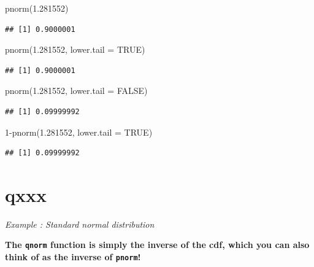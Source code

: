\documentclass[
]{book}
\newenvironment{Shaded}{\begin{snugshade}}{\end{snugshade}}
\newcommand{\AttributeTok}[1]{\textcolor[rgb]{0.77,0.63,0.00}{#1}}
\newcommand{\ConstantTok}[1]{\textcolor[rgb]{0.00,0.00,0.00}{#1}}
\newcommand{\DecValTok}[1]{\textcolor[rgb]{0.00,0.00,0.81}{#1}}
\newcommand{\FloatTok}[1]{\textcolor[rgb]{0.00,0.00,0.81}{#1}}
\newcommand{\FunctionTok}[1]{\textcolor[rgb]{0.00,0.00,0.00}{#1}}
\newcommand{\NormalTok}[1]{#1}
\newcommand{\SpecialCharTok}[1]{\textcolor[rgb]{0.00,0.00,0.00}{#1}}
\begin{document}
\begin{Shaded}
\begin{Highlighting}[]
\FunctionTok{pnorm}\NormalTok{(}\FloatTok{1.281552}\NormalTok{)}
\end{Highlighting}
\end{Shaded}

\begin{verbatim}
## [1] 0.9000001
\end{verbatim}

\begin{Shaded}
\begin{Highlighting}[]
\FunctionTok{pnorm}\NormalTok{(}\FloatTok{1.281552}\NormalTok{, }\AttributeTok{lower.tail =} \ConstantTok{TRUE}\NormalTok{)}
\end{Highlighting}
\end{Shaded}

\begin{verbatim}
## [1] 0.9000001
\end{verbatim}

\begin{Shaded}
\begin{Highlighting}[]
\FunctionTok{pnorm}\NormalTok{(}\FloatTok{1.281552}\NormalTok{, }\AttributeTok{lower.tail =} \ConstantTok{FALSE}\NormalTok{) }
\end{Highlighting}
\end{Shaded}

\begin{verbatim}
## [1] 0.09999992
\end{verbatim}

\begin{Shaded}
\begin{Highlighting}[]
\DecValTok{1}\SpecialCharTok{{-}}\FunctionTok{pnorm}\NormalTok{(}\FloatTok{1.281552}\NormalTok{, }\AttributeTok{lower.tail =} \ConstantTok{TRUE}\NormalTok{)}
\end{Highlighting}
\end{Shaded}

\begin{verbatim}
## [1] 0.09999992
\end{verbatim}

\hypertarget{qxxx}{%
\section{qxxx}\label{qxxx}}

\emph{Example : Standard normal distribution}

\textbf{The \texttt{qnorm} function is simply the inverse of the cdf, which you can also think of as the inverse of \texttt{pnorm}!}
\end{document}

